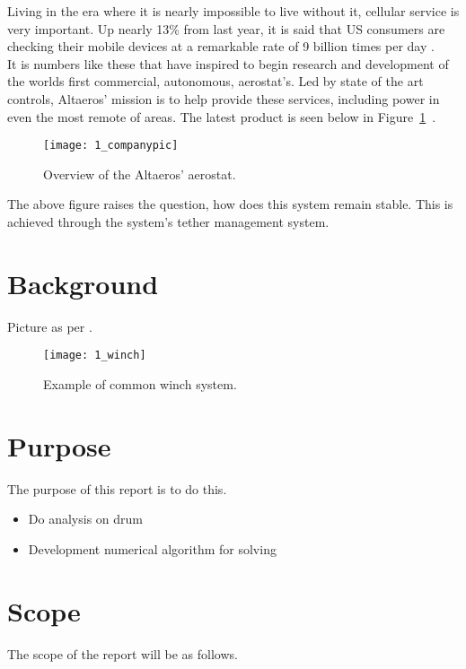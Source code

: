 \label{chapt:intro}

Living in the era where it is nearly impossible to live without it, cellular service is very important. Up nearly 13\% from last year, it is said that US consumers are checking their mobile devices at a remarkable rate of 9 billion times per day \cite{deloittestat}.\\

It is numbers like these that have inspired \Company to begin research and development of the worlds first commercial, autonomous, aerostat's. Led by state of the art controls, Altaeros' mission is to help provide these services, including power in even the most remote of areas. The latest product is seen below in Figure~\ref{fig:1_companypic}~\cite{companypicweb}.

\begin{figure}[H]
    \centering
    \texttt{[image: 1\_companypic]}
    \caption{Overview of the Altaeros' aerostat.}
    \label{fig:1_companypic}
\end{figure}


The above figure raises the question, how does this system remain stable. This is achieved through the system's tether management system.

\section{Background} %

Picture as per \cite{winchpic}.
\begin{figure}[H]
    \centering
    \texttt{[image: 1\_winch]}
    \caption{Example of common winch system. \protect\cite{winchpic}}
    \label{fig:1_winch}
\end{figure}

\section{Purpose}
The purpose of this report is to do this.
\begin{itemize}
    \item Do analysis on drum
    \item Development numerical algorithm for solving
\end{itemize}


\section{Scope} %

The scope of the report will be as follows.

